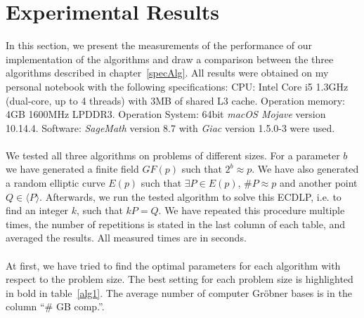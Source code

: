 \documentclass[thesis=M,english]{FITthesis}[2012/10/20]
\theoremstyle{remark}
\theoremstyle{definition}
\begin{document}
\section{Experimental Results}
\label{expResults}
In this section, we present the measurements of the performance of our implementation of the algorithms and draw a comparison between the three algorithms described in chapter~\ref{specAlg}. All results were obtained on my personal notebook with the following specifications:  CPU: Intel Core i5 1.3GHz (dual-core, up to 4 threads) with 3MB of shared L3 cache. Operation memory: 4GB 1600MHz LPDDR3. Operation System: 64bit \textit{macOS Mojave} version 10.14.4. Software: \textit{SageMath} version 8.7 with \textit{Giac} version 1.5.0-3 were used. 
\\ \\
\noindent We tested all three algorithms on problems of different sizes. For a parameter $b$ we have generated a finite field $GF(p)$ such that $2^b \approx p$. We have also generated a random elliptic curve $E(p)$ such that $\exists P \in E(p)$, $\#P \approx p$ and another point $Q \in \langle P \rangle$. Afterwards, we run the tested algorithm to solve this ECDLP, i.e. to find an integer $k$, such that $kP = Q$. We have repeated this procedure multiple times, the number of repetitions is stated in the last column of each table, and averaged the results. All measured times are in seconds. \\ \\ 
\noindent At first, we have tried to find the optimal parameters for each algorithm with respect to the problem size. The best setting for each problem size is highlighted in bold in table~\ref{alg1}. The average number of computer Gröbner bases is in the column \enquote{\# GB comp.}.  
\end{document}
